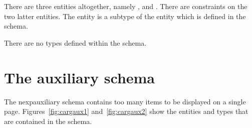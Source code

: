 \documentclass{article}
\begin{document}
There are three entities altogether, namely ,
 and . There are constraints on
the two latter entities. The entity  is a
subtype of the entity  which is defined in the
 schema.

There are no types defined within the schema.

\clearpage

\section{The auxiliary schema}

The nexp{auxiliary} schema contains too many items to be displayed on a single
page. Figures~\ref{fig:cargaux1} and~\ref{fig:cargaux2} show the entities and
types that are contained in the schema.
\end{document}
